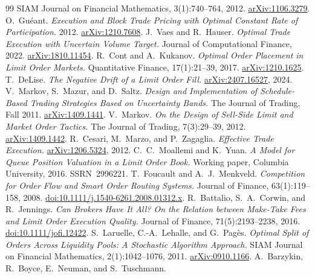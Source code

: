 \documentclass[11pt]{article}
\begin{document}
\begin{thebibliography}{99}
  SIAM Journal on Financial Mathematics, 3(1):740--764, 2012.
  \href{https://arxiv.org/abs/1106.3279}{arXiv:1106.3279}.
 O.~Gu\'eant.
  \emph{Execution and Block Trade Pricing with Optimal Constant Rate of
  Participation.} 2012.
  \href{https://arxiv.org/abs/1210.7608}{arXiv:1210.7608}.
 J.~Vaes and R.~Hauser.
  \emph{Optimal Trade Execution with Uncertain Volume Target.}
  Journal of Computational Finance, 2022.
  \href{https://arxiv.org/abs/1810.11454}{arXiv:1810.11454}.
 R.~Cont and A.~Kukanov.
  \emph{Optimal Order Placement in Limit Order Markets.}
  Quantitative Finance, 17(1):21--39, 2017.
  \href{https://arxiv.org/abs/1210.1625}{arXiv:1210.1625}.
 T.~DeLise.
  \emph{The Negative Drift of a Limit Order Fill.}
  \href{https://arxiv.org/abs/2407.16527}{arXiv:2407.16527}, 2024.
 V.~Markov, S.~Mazur, and D.~Saltz.
  \emph{Design and Implementation of Schedule-Based
  Trading Strategies Based on Uncertainty Bands.}
  The Journal of Trading, Fall 2011. \href{https://arxiv.org/abs/1409.1441}{arXiv:1409.1441}.
 V.~Markov.
  \emph{On the Design of Sell-Side Limit and
  Market Order Tactics.}
  The Journal of Trading, 7(3):29--39, 2012. \href{https://arxiv.org/abs/1409.1442}{arXiv:1409.1442}.
 R.~Cesari, M.~Marzo, and P.~Zagaglia.
  \emph{Effective Trade Execution.} \href{https://arxiv.org/abs/1206.5324}{arXiv:1206.5324}, 2012.
 C.~C.~Moallemi and K.~Yuan.
  \emph{A Model for Queue Position Valuation in a Limit Order Book.}
  Working paper, Columbia University, 2016. SSRN~2996221.
 T.~Foucault and A.~J.~Menkveld.
  \emph{Competition for Order Flow and Smart Order Routing Systems.}
  Journal of Finance, 63(1):119--158, 2008.
  \href{https://doi.org/10.1111/j.1540-6261.2008.01312.x}{doi:10.1111/j.1540-6261.2008.01312.x}.
 R.~Battalio, S.~A.~Corwin, and R.~Jennings.
  \emph{Can Brokers Have It All? On the Relation between Make-Take Fees and
  Limit Order Execution Quality.}
  Journal of Finance, 71(5):2193--2238, 2016.
  \href{https://doi.org/10.1111/jofi.12422}{doi:10.1111/jofi.12422}.
 S.~Laruelle, C.-A.~Lehalle, and G.~Pag\`es.
  \emph{Optimal Split of Orders Across Liquidity Pools: A Stochastic
  Algorithm Approach.} SIAM Journal on Financial Mathematics,
  2(1):1042--1076, 2011. \href{https://arxiv.org/abs/0910.1166}{arXiv:0910.1166}.
 A.~Barzykin, R.~Boyce, E.~Neuman, and S.~Tuschmann.

\end{thebibliography}
\end{document}
